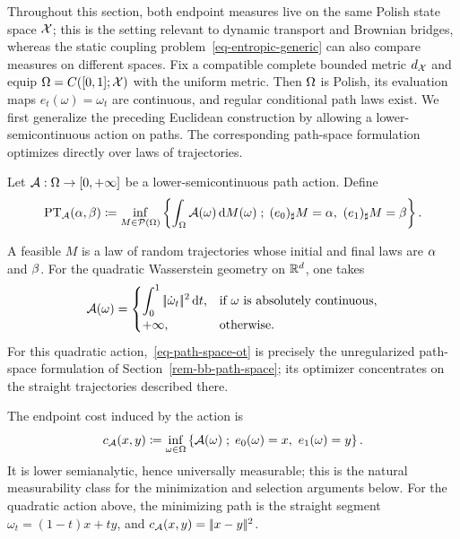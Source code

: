 Throughout this section, both endpoint measures live on the same Polish state space $\mathcal{X}$; this is the setting relevant to dynamic transport and Brownian bridges, whereas the static coupling problem~\eqref{eq-entropic-generic} can also compare measures on different spaces. Fix a compatible complete bounded metric $d_{\mathcal{X}}$ and equip $\Omega=C([0,1];\mathcal{X})$ with the uniform metric. Then $\Omega$ is Polish, its evaluation maps $e_t(\omega)=\omega_t$ are continuous, and regular conditional path laws exist. We first generalize the preceding Euclidean construction by allowing a lower-semicontinuous action on paths.
%
The corresponding path-space formulation optimizes directly over laws of trajectories.
\begin{defn}\label{def-path-space-transport}
Let $\mathcal{A}:\Omega\to[0,+\infty]$ be a lower-semicontinuous path action. Define
\begin{equation}\label{eq-path-space-ot}
	\operatorname{PT}_{\mathcal{A}}(\alpha,\beta)
	\coloneqq
	\inf_{M\in\mathcal{P}(\Omega)}
	\left\{ 
		\int_\Omega \mathcal{A}(\omega)\,\mathrm{d} M(\omega)
	 \;;\; 
		(e_0)_\sharp M=\alpha,\ (e_1)_\sharp M=\beta
	 \right\}.
\end{equation}
\end{defn}
A feasible $M$ is a law of random trajectories whose initial and final laws are $\alpha$ and $\beta$.
For the quadratic Wasserstein geometry on $\mathbb{R}^d$, one takes
\[
	\mathcal{A}(\omega)=
	\begin{cases}
	\displaystyle \int_0^1 |\!| \dot\omega_t |\!|^2\,\mathrm{d} t,
		& \text{if }\omega\text{ is absolutely continuous},\\[.4em]
	+\infty, & \text{otherwise}.
	\end{cases}
\]
For this quadratic action,~\eqref{eq-path-space-ot} is precisely the unregularized path-space formulation of Section~\ref{rem-bb-path-space}; its optimizer concentrates on the straight trajectories described there.

The endpoint cost induced by the action is
\begin{equation}\label{eq-path-action-endpoint-cost}
	c_{\mathcal{A}}(x,y)
	\coloneqq
	\inf_{\omega\in\Omega}
	\left\{ \mathcal{A}(\omega) \;;\; e_0(\omega)=x,\ e_1(\omega)=y \right\}.
\end{equation}
It is lower semianalytic, hence universally measurable; this is the natural measurability class for the minimization and selection arguments below.
For the quadratic action above, the minimizing path is the straight segment
$\omega_t=(1-t)x+ty$, and $c_{\mathcal{A}}(x,y)=|\!| x-y |\!|^2$.

